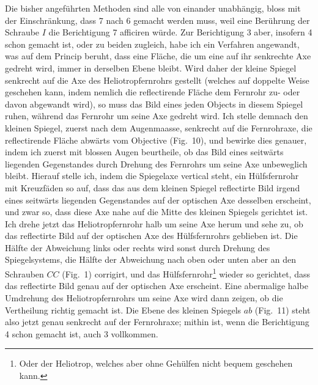 \documentclass[12pt,a4paper]{article}
\theoremstyle{plain}
\theoremstyle{definition}
\theoremstyle{remark}
\begin{document}
Die bisher angef\"uhrten Methoden sind alle von einander unabh\"angig, bloss mit der Einschr\"ankung, dass 7 nach 6 gemacht werden muss, weil eine Ber\"uhrung der Schraube $I$ die Berichtigung 7 afficiren w\"urde. Zur Berichtigung 3 aber, insofern 4 schon gemacht ist, oder zu beiden zugleich, habe ich ein Verfahren angewandt, was auf dem Princip beruht, dass eine Fl\"ache, die um eine auf ihr senkrechte Axe gedreht wird, immer in derselben Ebene bleibt. Wird daher der kleine Spiegel senkrecht auf die Axe des Heliotropfernrohrs gestellt (welches auf doppelte Weise geschehen kann, indem nemlich die reflectirende Fl\"ache dem Fernrohr zu- oder davon abgewandt wird), so muss das Bild eines jeden Objects in diesem Spiegel ruhen, w\"ahrend das Fernrohr um seine Axe gedreht wird. Ich stelle demnach den kleinen Spiegel, zuerst nach dem Augenmaasse, senkrecht auf die Fernrohraxe, die reflectirende Fl\"ache abw\"arts vom Objective (Fig.~10), und bewirke dies genauer, indem ich zuerst mit blossen Augen beurtheile, ob das Bild eines seitw\"arts liegenden Gegenstandes durch Drehung des Fernrohrs um seine Axe unbeweglich bleibt. Hierauf stelle ich, indem die Spiegelaxe vertical steht, ein H\"ulfsfernrohr mit Kreuzf\"aden so auf, dass das aus dem kleinen Spiegel reflectirte Bild irgend eines seitw\"arts liegenden Gegenstandes auf der optischen Axe desselben erscheint, und zwar so, dass diese Axe nahe auf die Mitte des kleinen Spiegels gerichtet ist. Ich drehe jetzt das Heliotropfernrohr halb um seine Axe herum und sehe zu, ob das reflectirte Bild auf der optischen Axe des H\"ulfsfernrohrs geblieben ist. Die H\"alfte der Abweichung links oder rechts wird sonst durch Drehung des Spiegelsystems, die H\"alfte der Abweichung nach oben oder unten aber an den Schrauben $CC$ (Fig.~1) corrigirt, und das H\"ulfsfernrohr\footnote{Oder der Heliotrop, welches aber ohne Geh\"ulfen nicht bequem geschehen kann.} wieder so gerichtet, dass das reflectirte Bild genau auf der optischen Axe erscheint. Eine abermalige halbe Umdrehung des Heliotropfernrohrs um seine Axe wird dann zeigen, ob die Vertheilung richtig gemacht ist. Die Ebene des kleinen Spiegels $ab$ (Fig.~11) steht also jetzt genau senkrecht auf der Fernrohraxe; mithin ist, wenn die Berichtigung 4 schon gemacht ist, auch 3 vollkommen.
\end{document}
